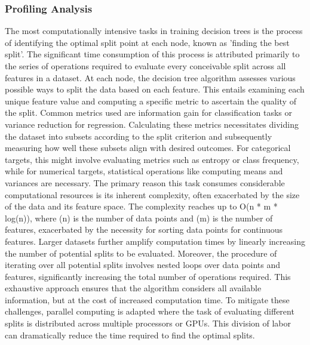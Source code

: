 \documentclass[11.5pt]{article}
\begin{document}
\subsubsection{Profiling Analysis}
The most computationally intensive tasks in training decision trees is the process of identifying the optimal split point at each node, known as 'finding the best split'. The significant time consumption of this process is attributed primarily to the series of operations required to evaluate every conceivable split across all features in a dataset.
\newline
\newline
At each node, the decision tree algorithm assesses various possible ways to split the data based on each feature. This entails examining each unique feature value and computing a specific metric to ascertain the quality of the split. Common metrics used are information gain for classification tasks or variance reduction for regression. Calculating these metrics necessitates dividing the dataset into subsets according to the split criterion and subsequently measuring how well these subsets align with desired outcomes. For categorical targets, this might involve evaluating metrics such as entropy or class frequency, while for numerical targets, statistical operations like computing means and variances are necessary.
\newline
\newline
The primary reason this task consumes considerable computational resources is its inherent complexity, often exacerbated by the size of the data and its feature space. The complexity reaches up to O(n * m * log(n)), where (n) is the number of data points and (m) is the number of features, exacerbated by the necessity for sorting data points for continuous features. Larger datasets further amplify computation times by linearly increasing the number of potential splits to be evaluated.
\newline
\newline
Moreover, the procedure of iterating over all potential splits involves nested loops over data points and features, significantly increasing the total number of operations required. This exhaustive approach ensures that the algorithm considers all available information, but at the cost of increased computation time. 
\newline
\newline
To mitigate these challenges, parallel computing is adapted where the task of evaluating different splits is distributed across multiple processors or GPUs. This division of labor can dramatically reduce the time required to find the optimal splits.
\end{document}
